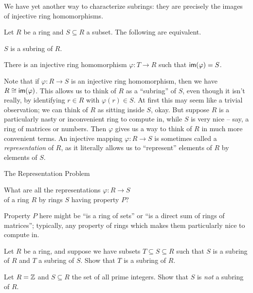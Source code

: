 We have yet another way to characterize subrings: they are precisely the images of injective ring homomorphisms.

\begin{prop}
Let \(R\) be a ring and \(S \subseteq R\) a subset.
The following are equivalent.
\begin{proplist}
\item \(S\) is a subring of \(R\).
\item There is an injective ring homomorphism \(\varphi : T \rightarrow R\) such that \( \mathsf{im}(\varphi)  = S\).
\end{proplist}
\end{prop}

Note that if \(\varphi : R \rightarrow S\) is an injective ring homomorphism, then we have \(R \cong  \mathsf{im}(\varphi) \).
This allows us to think of \(R\) as a ``subring'' of \(S\), even though it isn't really, by identifying \(r \in R\) with \(\varphi(r) \in S\).
At first this may seem like a trivial observation; we can think of \(R\) as sitting inside \(S\), okay.
But suppose \(R\) is a particularly nasty or inconvenient ring to compute in, while \(S\) is very nice -- say, a ring of matrices or numbers.
Then \(\varphi\) gives us a way to think of \(R\) in much more convenient terms.
An injective mapping \(\varphi : R \rightarrow S\) is sometimes called a \emph{representation} of \(R\), as it literally allows us to ``represent'' elements of \(R\) by elements of \(S\).
\begin{titlebox}{The Representation Problem}
\begin{center}
What are all the representations \(\varphi : R \rightarrow S\) \\ of a ring \(R\) by rings \(S\) having property \(P\)?
\end{center}
\end{titlebox}
Property \(P\) here might be ``is a ring of sets'' or ``is a direct sum of rings of matrices''; typically, any property of rings which makes them particularly nice to compute in.



\Exercises%

\begin{exercise}
Let \(R\) be a ring, and suppose we have subsets \(T \subseteq S \subseteq R\) such that \(S\) is a subring of \(R\) and \(T\) a subring of \(S\).
Show that \(T\) is a subring of \(R\).
\end{exercise}

\begin{exercise}
Let \(R = \mathbb{Z}\) and \(S \subseteq R\) the set of all prime integers.
Show that \(S\) is \emph{not} a subring of \(R\).
\end{exercise}

